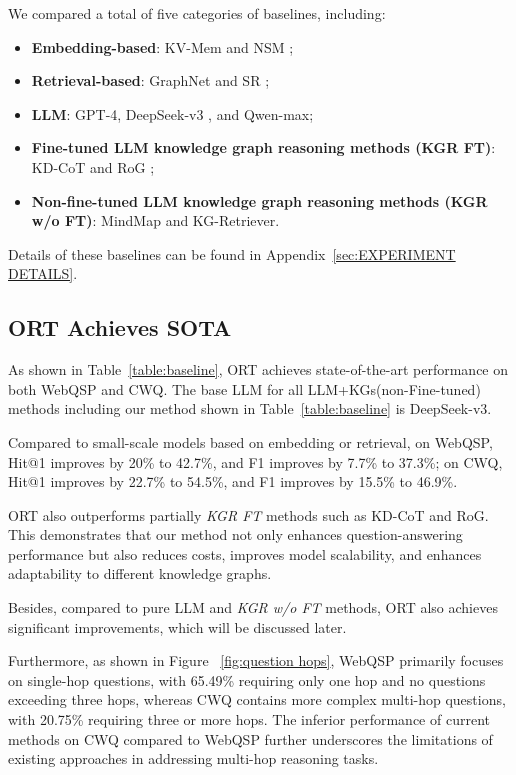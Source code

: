 We compared a total of five categories of baselines, including:
\begin{itemize}
    \item \textbf{Embedding-based}: KV-Mem \cite{Miller2016KeyValueMN} and NSM \cite{He2021ImprovingMK};
    \item \textbf{Retrieval-based}: GraphNet \cite{Sun2018OpenDQ} and SR \cite{Zhang2022SubgraphRE};
    \item \textbf{LLM}: GPT-4, DeepSeek-v3 \cite{DeepSeekAI2024DeepSeekV3TR}, and Qwen-max;
    \item \textbf{Fine-tuned LLM knowledge graph reasoning methods (KGR FT)}: KD-CoT \cite{Wang2023KnowledgeDrivenCE} and RoG \cite{Luo2023ReasoningOG};
    \item \textbf{Non-fine-tuned LLM knowledge graph reasoning methods (KGR w/o FT)}: MindMap \cite{wen-etal-2024-mindmap} and KG-Retriever.
\end{itemize}
Details of these baselines can be found in Appendix~\ref{sec:EXPERIMENT DETAILS}.

\subsection{ORT Achieves SOTA}

As shown in Table~\ref{table:baseline}, ORT achieves state-of-the-art performance on both WebQSP and CWQ. The base LLM for all LLM+KGs(non-Fine-tuned) methods including our method shown in Table~\ref{table:baseline} is DeepSeek-v3.

Compared to small-scale models based on embedding or retrieval, on WebQSP, Hit@1 improves by 20\% to 42.7\%, and F1 improves by 7.7\% to 37.3\%; on CWQ, Hit@1 improves by 22.7\% to 54.5\%, and F1 improves by 15.5\% to 46.9\%. 

ORT also outperforms partially \textit{KGR FT} methods such as KD-CoT and RoG. This demonstrates that our method not only enhances question-answering performance but also reduces costs, improves model scalability, and enhances adaptability to different knowledge graphs. 

Besides, compared to pure LLM and \textit{KGR w/o FT} methods, ORT also achieves significant improvements, which will be discussed later.

Furthermore, as shown in Figure ~\ref{fig:question hops}, WebQSP primarily focuses on single-hop questions, with 65.49\% requiring only one hop and no questions exceeding three hops, whereas CWQ contains more complex multi-hop questions, with 20.75\% requiring three or more hops. The inferior performance of current methods on CWQ compared to WebQSP further underscores the limitations of existing approaches in addressing multi-hop reasoning tasks.


